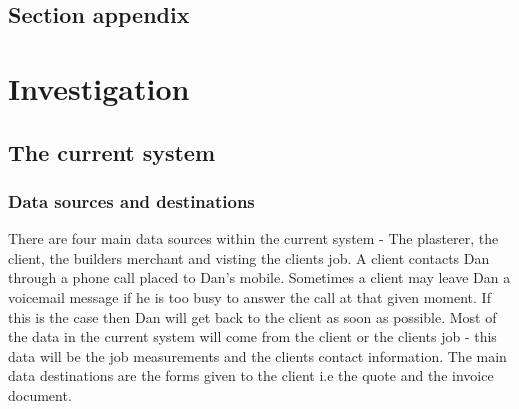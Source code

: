 \subsection{Section appendix}

\section{Investigation}

\subsection{The current system}

\subsubsection{Data sources and destinations}



\begin{flushleft}
	There are four main data sources within the current system - The plasterer, the client, the builders merchant and visting the clients job. A client contacts Dan through a phone call placed to Dan's mobile. Sometimes a client may leave Dan a voicemail message if he is too busy to answer the call at that given moment. If this is the case then Dan will get back to the client as soon as possible. Most of the data in the current system will come from the client or the clients job - this data will be the job measurements and the clients contact information. The main data destinations are the forms given to the client i.e the quote and the invoice document.




\end{flushleft}



